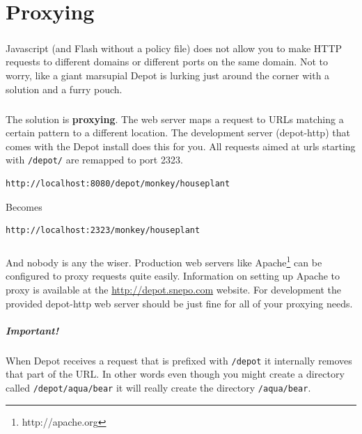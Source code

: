 \documentclass{report}
\begin{document}
\chapter{Proxying}
\paragraph{}
Javascript (and Flash without a policy file) does not allow you to
make HTTP requests to different domains or different ports on the same
domain. Not to worry, like a giant marsupial Depot is lurking just
around the corner with a solution and a furry pouch.
\paragraph{}
The solution is \textbf{proxying}. The web server maps a request to
URLs matching a certain pattern to a different location. The
development server (depot-http) that comes with the Depot install does
this for you. All requests aimed at urls starting with
\texttt{/depot/} are remapped to port 2323.

\begin{Verbatim}[frame=single]
http://localhost:8080/depot/monkey/houseplant
\end{Verbatim}

Becomes 

\begin{Verbatim}[frame=single]
http://localhost:2323/monkey/houseplant
\end{Verbatim}

\paragraph{}
And nobody is any the wiser. Production web servers like
Apache\footnote{http://apache.org} can be configured to proxy requests
quite easily. Information on setting up Apache to proxy is available
at the \url{http://depot.snepo.com} website. For development the
provided depot-http web server should be just fine for all of your
proxying needs.

\paragraph{Important!} When Depot receives a request that is prefixed
with \texttt{/depot} it internally removes that part of the URL. In
other words even though you might create a directory called
\texttt{/depot/aqua/bear} it will really create the directory
\texttt{/aqua/bear}. 
\end{document}

